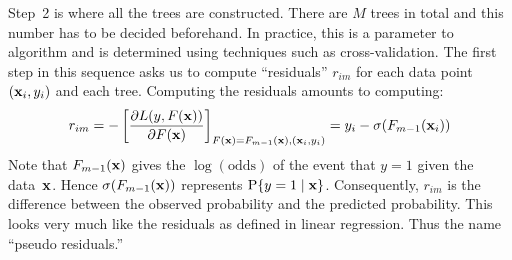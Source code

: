 Step~2 is where all the trees are constructed. There are $M$ trees in total and 
this number has to be decided beforehand. In practice, this is a parameter to 
algorithm and is determined using techniques such as cross-validation. The first 
step in this sequence asks us to compute ``residuals'' $r_{i m}$ for each data 
point $(\mathbf{x}_i, y_i)$ and each tree. Computing the residuals amounts 
to computing:
\[
    r_{i m} = - \left [ 
                        \frac{\partial L(y, F(\mathbf{x}))}{\partial F(\mathbf{x})} 
                \right ]_{F(\mathbf{x}) = F_{m - 1}(\mathbf{x}), (\mathbf{x}_i, y_i)}
            = y_i - \sigma(F_{m - 1}(\mathbf{x}_i))
\]  
Note that $F_{m - 1}(\mathbf{x})$ gives the $\log (\text{odds})$ of the event that 
$y = 1$ given the data~$\mathbf{x}$. Hence $\sigma(F_{m - 1}(\mathbf{x}))$ represents 
$\operatorname{P} \{y = 1 \mid \mathbf{x} \}$. Consequently, $r_{im}$ is the difference between 
the observed probability and the predicted probability. This looks very much 
like the residuals as defined in linear regression. Thus the name ``pseudo residuals.''

